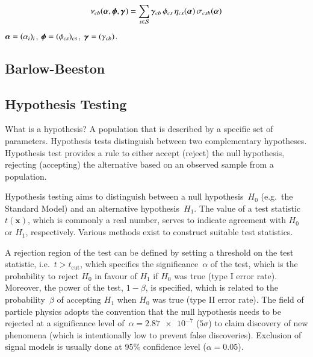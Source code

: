 \begin{align*}
  \nu_{cb}(\boldsymbol{\alpha}, \boldsymbol{\phi}, \boldsymbol{\gamma}) = \sum_{s \in \mathcal{S}} \gamma_{cb} \, \phi_{cs} \, \eta_{cs}(\boldsymbol{\alpha}) \, \sigma_{csb}(\boldsymbol{\alpha})
\end{align*}
$\boldsymbol{\alpha} = (\alpha_i)_i$, $\boldsymbol{\phi} = (\phi_{cs})_{cs}$,
$\boldsymbol{\gamma} = (\gamma_{cb})$.




\subsection{Barlow-Beeston}

\cite{barlow1993,conway2011}


\subsection{Hypothesis Testing}

What is a hypothesis? A population that is described by a specific set
of parameters. Hypothesis tests distinguish between two complementary
hypotheses. Hypothesis test provides a rule to either accept (reject)
the null hypothesis, rejecting (accepting) the alternative based on an
observed sample from a population.


Hypothesis testing aims to distinguish between a null hypothesis~$H_0$
(e.g.\ the Standard Model) and an alternative hypothesis~$H_1$. The
value of a test statistic~$t(\mathbf{x})$, which is commonly a real
number, serves to indicate agreement with $H_0$ or $H_1$,
respectively. Various methods exist to construct suitable test
statistics.

A rejection region of the test can be defined by setting a threshold
on the test statistic, i.e.\ $t > t_\text{cut}$, which specifies the
significance~$\alpha$ of the test, which is the probability to reject
$H_0$ in favour of $H_1$ if $H_0$ was true (type I error
rate). Moreover, the power of the test, $1 - \beta$, is specified,
which is related to the probability~$\beta$ of accepting $H_1$ when
$H_0$ was true (type II error rate). The field of particle physics
adopts the convention that the null hypothesis needs to be rejected at
a significance level of~$\alpha = \num{2.87e-7}$ ($5\sigma$) to claim
discovery of new phenomena (which is intentionally low to prevent
false discoveries). Exclusion of signal models is usually done at 95\%
confidence level ($\alpha = 0.05$).



